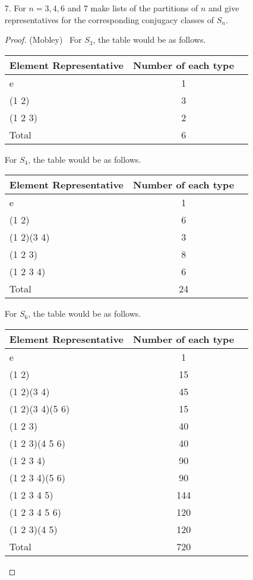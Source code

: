 \documentclass[10pt]{article}
\begin{document}
\begin{itemize}
\begin{proof}
\end{proof}

\item[7.]  For $n=3,4,6$ and $7$ make lists of the partitions of $n$ and give representatives for the corresponding conjugacy classes of $S_n$.

\begin{proof}(Mobley) \ For $S_3$, the table would be as follows.

\begin{center}
  \begin{tabular}{ l  c  r | }
    Element Representative & Number of each type \\ \hline
    e & 1 \\ \hline
    (1 2) & 3 \\ \hline
    (1 2 3) & 2 \\ \hline
    \hline
    Total & 6
  \end{tabular}
\end{center}

For $S_4$, the table would be as follows.

\begin{center}
  \begin{tabular}{ l  c  r | }
    Element Representative & Number of each type \\ \hline
    e & 1 \\ \hline
    (1 2) & 6 \\ \hline
    (1 2)(3 4) & 3 \\ \hline
    (1 2 3) & 8 \\ \hline
    (1 2 3 4) & 6 \\ \hline
    \hline
    Total & 24
  \end{tabular}
\end{center}

For $S_6$, the table would be as follows.

\begin{center}
  \begin{tabular}{ l  c  r | }
    Element Representative & Number of each type \\ \hline
    e & 1 \\ \hline
    (1 2) & 15 \\ \hline
    (1 2)(3 4) & 45 \\ \hline
    (1 2)(3 4)(5 6) & 15 \\ \hline
    (1 2 3) & 40 \\ \hline
    (1 2 3)(4 5 6) & 40 \\ \hline
    (1 2 3 4) & 90 \\ \hline
    (1 2 3 4)(5 6) & 90 \\ \hline
    (1 2 3 4 5) & 144 \\ \hline
    (1 2 3 4 5 6) & 120 \\ \hline
    (1 2 3)(4 5) & 120 \\ \hline
    \hline
    Total & 720
  \end{tabular}
\end{center}


\end{proof}
\end{itemize}
\end{document}
